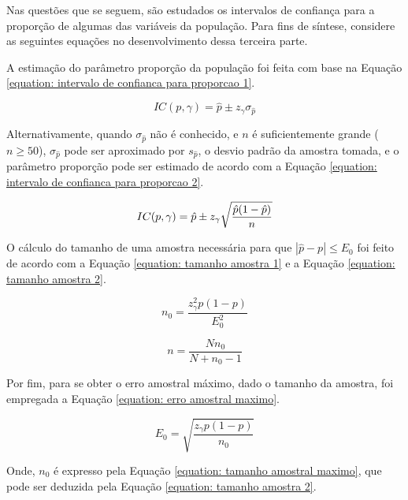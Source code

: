 \documentclass[10pt,a4paper,oneside]{article}
\begin{document}
	Nas questões que se seguem, são estudados os intervalos de confiança
	para a proporção de algumas das variáveis da população. Para fins de
	síntese, considere as seguintes equações no desenvolvimento dessa
	terceira parte.
	
	A estimação do parâmetro proporção da população foi feita com base na
	Equação \ref{equation: intervalo de confianca para proporcao 1}.

		\begin{equation}
			IC(p, \gamma) = \hat{p} \pm z_\gamma \sigma_{\hat{p}}
			\label{equation: intervalo de confianca para proporcao 1}
		\end{equation}
	
	Alternativamente, quando $\sigma_{\hat{p}}$ não é conhecido, e $n$ é
	suficientemente grande ($n \geq 50$), $\sigma_{\hat{p}}$ pode
	ser aproximado por $s_{\hat{p}}$, o desvio padrão da amostra tomada, e o
	parâmetro proporção pode ser estimado de acordo com a Equação
	\ref{equation: intervalo de confianca para proporcao 2}.

		\begin{equation}
			IC(p, \gamma) = \hat{p} \pm z_\gamma \sqrt{\frac{\hat{p}(1-\hat{p})}{n}} \\
			\label{equation: intervalo de confianca para proporcao 2}
		\end{equation}
	
	O cálculo do tamanho de uma amostra necessária para que $|\hat{p} - p|
	\leq E_0$ foi feito de acordo com a Equação \ref{equation: tamanho amostra
	1} e a Equação \ref{equation: tamanho amostra 2}.

	\begin{equation}
		n_0 = \frac{z_\gamma^2 p(1-p)}{E_0^2}
		\label{equation: tamanho amostra 1}
	\end{equation}

	\begin{equation}
		n = \frac{N n_0}{N + n_0 - 1}
		\label{equation: tamanho amostra 2}
	\end{equation}

	Por fim, para se obter o erro amostral máximo, dado o tamanho da
	amostra, foi empregada a Equação \ref{equation: erro amostral maximo}.
	
	\begin{equation}
		E_0 = \sqrt{\frac{z_\gamma p(1 - p) }{n_0}}
		\label{equation: erro amostral maximo}
	\end{equation}
	
	Onde, $n_0$ é expresso pela Equação	\ref{equation: tamanho amostral
	maximo}, que pode ser deduzida pela Equação \ref{equation: tamanho
	amostra 2}.
\end{document}
